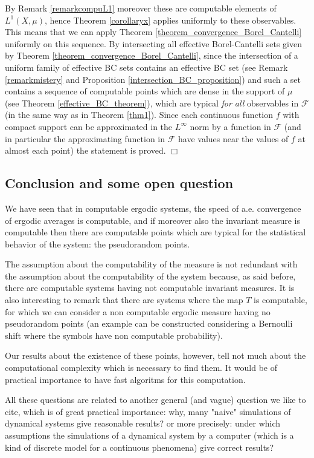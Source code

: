 \documentclass[copyright,creativecommons]{eptcs}
\numberwithin{equation}{section}
\begin{document}
By Remark \ref{remarkcompuL1} moreover these are computable elements of $L^{1}(X,\mu )$, hence Theorem \ref{corollaryx} applies uniformly to these
observables. This means that we can apply Theorem \ref {theorem_convergence_Borel_Cantelli} uniformly on this sequence. By
intersecting all effective Borel-Cantelli sets given by Theorem \ref {theorem_convergence_Borel_Cantelli}, since the intersection of a uniform
family of effective BC sets contains an effective BC set (see Remark \ref {remarkmistery} and Proposition \ref{intersection_BC_proposition}) and such
a set contains a sequence of computable points which are dense in the
support of $\mu $ (see Theorem \ref{effective_BC_theorem}), which are
typical {\em for all} observables in $\mathcal{F}$ (in the same way as in Theorem \ref{thm1}). Since each continuous function $f$ with compact support can be
approximated in the $L^{\infty }$ norm by a function in $\mathcal{F}$ (and
in particular the approximating function in $\mathcal{F}$ have values near
the values of $f$ at almost each point) the statement is proved.
$\Box $
\subsection{Conclusion and some open question}

We have seen that in computable ergodic systems, the speed of a.e.
convergence of ergodic averages is computable, and if moreover also the
invariant measure is computable then there are computable points which are
typical for the statistical behavior of the system: the pseudorandom points.

The assumption about the computability of the measure is not redundant with
the assumption about the computability of the system because, as said
before, there are computable systems having not computable invariant
measures. It is also interesting to remark that there 
are systems where the map $T$ is computable, for which we can consider a non computable ergodic measure having no pseudorandom points (an example can be constructed considering a Bernoulli shift where the symbols have non computable probability).

Our results about the existence of these points, however, tell not much
about the computational complexity which is necessary to find them. It would
be of practical importance to have fast algoritms for this computation.

All these questions are related to another general (and vague) question we
like to cite, which is of great practical importance:  why, many "naive"
simulations of  dynamical systems give reasonable results? or more
precisely: under which assumptions the simulations of a dynamical system by
a computer (which is a kind of discrete model for a continuous phenomena)
give correct results?
\end{document}
